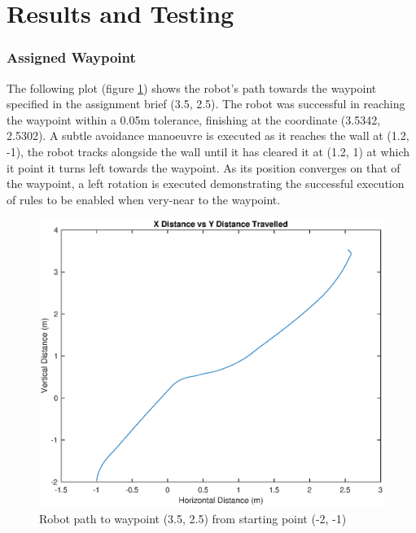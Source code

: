 \documentclass[10pt]{article}
\newcommand{\graphScale}{0.5}
\begin{document}
\section{Results and Testing}
\subsubsection{Assigned Waypoint}
The following plot (figure \ref{fig:ToWaypoint}) shows the robot's path towards the waypoint specified in the assignment brief (3.5, 2.5).
The robot was successful in reaching the waypoint within a 0.05m tolerance, finishing at the coordinate (3.5342, 2.5302).
A subtle avoidance manoeuvre is executed as it reaches the wall at (1.2, -1), the robot tracks alongside the wall until it has cleared it at (1.2, 1) at which it point it turns left towards the waypoint.
As its position converges on that of the waypoint, a left rotation is executed demonstrating the successful execution of rules to be enabled when very-near to the waypoint. 
\begin{figure}[H]
    \centering
\includegraphics[scale=\graphScale]{./figures/ToWaypoint.eps}
\caption{Robot path to waypoint (3.5, 2.5) from starting point (-2, -1)}
\label{fig:ToWaypoint}
\end{figure}
\end{document}
